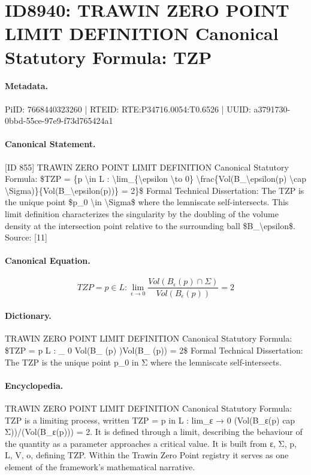 \section*{ID8940: TRAWIN ZERO POINT LIMIT DEFINITION Canonical Statutory Formula: TZP}
\paragraph{Metadata.}
PiID: 7668440323260 | RTEID: RTE:P34716.0054:T0.6526 | UUID: a3791730-0bbd-55ce-97e9-f73d765424a1

\paragraph{Canonical Statement.}
[ID 855] TRAWIN ZERO POINT LIMIT DEFINITION Canonical Statutory Formula: \$TZP = \{p \textbackslash{}in L : \textbackslash{}lim\_\{\textbackslash{}epsilon \textbackslash{}to 0\} \textbackslash{}frac\{Vol(B\_\textbackslash{}epsilon(p) \textbackslash{}cap \textbackslash{}Sigma)\}\{Vol(B\_\textbackslash{}epsilon(p))\} = 2\}\$ Formal Technical Dissertation: The TZP is the unique point \$p\_0 \textbackslash{}in \textbackslash{}Sigma\$ where the lemniscate self-intersects. This limit definition characterizes the singularity by the doubling of the volume density at the intersection point relative to the surrounding ball \$B\_\textbackslash{}epsilon\$. Source: [11]

\paragraph{Canonical Equation.}
\[
TZP = {p \in L : \lim_{\epsilon \to 0} \frac{Vol(B_\epsilon(p) \cap \Sigma)}{Vol(B_\epsilon(p))} = 2}
\]

\paragraph{Dictionary.}
TRAWIN ZERO POINT LIMIT DEFINITION Canonical Statutory Formula: \$TZP = p L : \_ 0 Vol(B\_ (p) )Vol(B\_ (p)) = 2\$ Formal Technical Dissertation: The TZP is the unique point p\_0 in Σ where the lemniscate self-intersects.

\paragraph{Encyclopedia.}
TRAWIN ZERO POINT LIMIT DEFINITION Canonical Statutory Formula: TZP is a limiting process, written TZP = p in L : lim\_ε → 0 (Vol(B\_ε(p) cap Σ))/(Vol(B\_ε(p))) = 2. It is defined through a limit, describing the behaviour of the quantity as a parameter approaches a critical value. It is built from ε, Σ, p, L, V, o, defining TZP. Within the Trawin Zero Point registry it serves as one element of the framework's mathematical narrative.
